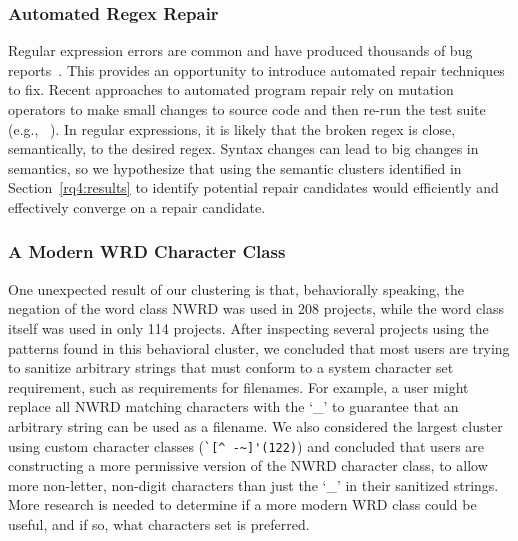 \subsubsection{Automated Regex Repair}
Regular expression errors are common and have produced thousands of bug reports~\cite{Spishak:2012:TSR:2318202.2318207}. This provides an opportunity to introduce automated repair techniques to fix. 
Recent approaches to automated program repair rely on mutation operators to make small changes to source code and then re-run the test suite (e.g., ~\cite{cacm10, genprog-tse-journal}). In regular expressions, it is likely that the broken regex is close, semantically, to the desired regex. Syntax changes can lead to big changes in semantics, so we hypothesize that using the semantic clusters identified in Section~\ref{rq4:results} to identify potential repair candidates would efficiently and effectively converge on a repair candidate. 


\subsubsection{A Modern WRD Character Class}
One unexpected result of our clustering is that, behaviorally speaking, the negation of the word class NWRD was used in 208 projects, while the word class itself was used in only 114 projects. After inspecting several projects using the patterns found in this behavioral cluster, we concluded that most users are trying to sanitize arbitrary strings that must conform to a system character set requirement, such as requirements for filenames.  For example, a user might replace all NWRD matching characters with the `\_' to guarantee that an arbitrary string can be used as a filename.  We also considered the largest cluster using custom character classes (\verb?`[^ -~]'(122)?) and concluded that users are constructing a more permissive version of the NWRD character class, to allow more non-letter, non-digit characters than just the `\_' in their sanitized strings.  More research is needed to determine if a more modern WRD class could be useful, and if so, what characters set is preferred.


